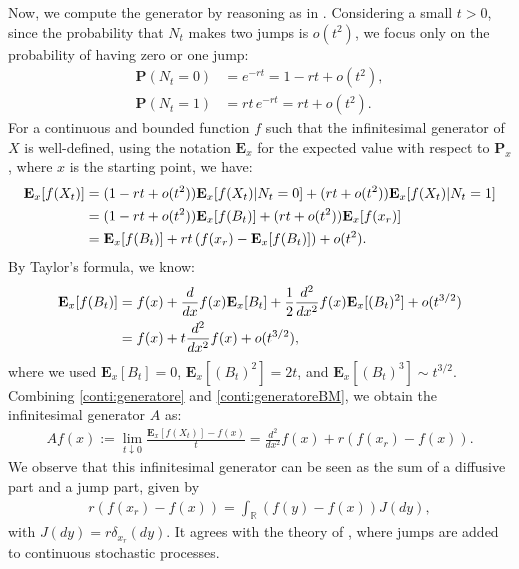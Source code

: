 \documentclass[11pt,a4paper]{article}
\theoremstyle{definition}
\theoremstyle{remark}
\begin{document}
Now, we compute the generator by reasoning as in \cite{generators}. Considering a small \( t > 0 \), since the probability that \( N_t \) makes two jumps is \( o(t^2) \), we focus only on the probability of having zero or one jump:
\begin{align*}
	\mathbf{P}(N_t=0) &= e^{-rt} = 1 - rt + o(t^2), \\
	\mathbf{P}(N_t=1) &= rt\,e^{-rt} = rt + o(t^2).
\end{align*}
For a continuous and bounded function \( f \) such that the infinitesimal generator of \( X \) is well-defined, using the notation \( \mathbf{E}_x \) for the expected value with respect to \( \mathbf{P}_x \), where \( x \) is the starting point, we have:
\begin{align}
	\label{conti:generatore}
	\mathbf{E}_x [f(X_t)] &= (1 - rt + o(t^2)) \mathbf{E}_x[f(X_t) \vert N_t=0] + (rt + o(t^2)) \mathbf{E}_x[f(X_t) \vert N_t=1] \notag\\
	&= (1 - rt + o(t^2)) \mathbf{E}_x[f(B_t)] + (rt + o(t^2)) \mathbf{E}_x[f(x_r)]	\notag\\
	&= \mathbf{E}_x[f(B_t)] + rt \left(f(x_r) - \mathbf{E}_x[f(B_t)] \right) + o(t^2).
\end{align}
By Taylor's formula, we know:
\begin{align}
	\label{conti:generatoreBM}
	\mathbf{E}_x[f(B_t)] &= f(x) + \frac{d}{dx} f(x) \mathbf{E}_x[B_t] + \frac{1}{2} \frac{d^2}{dx^2} f(x) \mathbf{E}_x[(B_t)^2] + o(t^{3/2}) 	\notag\\
	&= f(x) + t \frac{d^2}{dx^2} f(x) + o(t^{3/2}),
\end{align}
where we used \( \mathbf{E}_x[B_t] = 0 \), \( \mathbf{E}_x[(B_t)^2] = 2t \), and \( \mathbf{E}_x[(B_t)^3] \sim t^{3/2} \). Combining \eqref{conti:generatore} and \eqref{conti:generatoreBM}, we obtain the infinitesimal generator \( A \) as:
\begin{align}
	\label{generator}
	Af(x) := \lim_{t \downarrow 0} \frac{\mathbf{E}_x [f(X_t)] - f(x)}{t} = \frac{d^2}{dx^2} f(x) + r (f(x_r) - f(x)).
\end{align}
We observe that this infinitesimal generator can be seen as the sum of a diffusive part and a jump part, given by
\begin{align}
	\label{jump-measure}
	r (f(x_r) - f(x))= \int_\mathbb{R} (f(y) - f(x)) J(dy),
\end{align}
with $J(dy)=r \delta_{x_r}(dy)$. It agrees with the theory of \cite{bass-adding}, where jumps are added to continuous stochastic processes.
\end{document}
